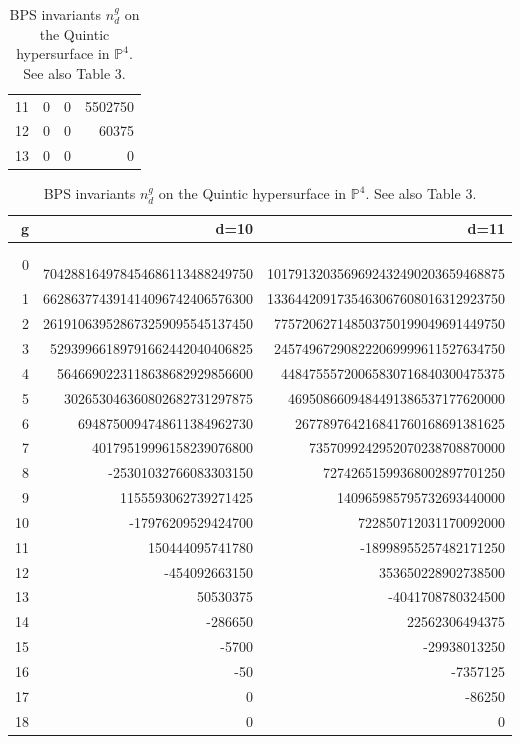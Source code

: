 \documentclass[12pt]{article}
\begin{document}
\begin{table}
\begin{centering}
\begin{tabular}{|r|rrr|}
11& 0& 0& 5502750\\
12& 0& 0& 60375\\
13& 0& 0&  0\\
\hline
\end{tabular}
\begin{tabular}{|r|rr|}
\hline
g &d=10 & d=11 \\
\hline
0& \quad \,\,\,\,704288164978454686113488249750&  \quad \,\,\,\,\,   1017913203569692432490203659468875\\
1& 662863774391414096742406576300& 1336442091735463067608016312923750 \\
2& 261910639528673259095545137450& 775720627148503750199049691449750 \\
3& 52939966189791662442040406825 & 245749672908222069999611527634750 \\
4& 5646690223118638682929856600  &44847555720065830716840300475375\\
5& 302653046360802682731297875   & 4695086609484491386537177620000\\
6& 6948750094748611384962730     &267789764216841760168691381625\\
7& 40179519996158239076800       &7357099242952070238708870000\\
8& -25301032766083303150         &72742651599368002897701250\\
9& 1155593062739271425           &140965985795732693440000\\
10& -17976209529424700           &722850712031170092000 \\
11& 150444095741780              &-18998955257482171250\\
12& -454092663150                & 353650228902738500 \\
13&   50530375                   &-4041708780324500\\
14&  -286650                     &22562306494375\\
15&   -5700                      &-29938013250\\
16&    -50                       & -7357125\\
17&     0                        &  -86250\\
18&     0                        &      0\\
\hline
\end{tabular}
\caption{BPS invariants $n^g_d$ on the Quintic hypersurface in $\mathbb{P}^4$. See also Table 3.}
\end{centering}
\end{table}
\end{document}
